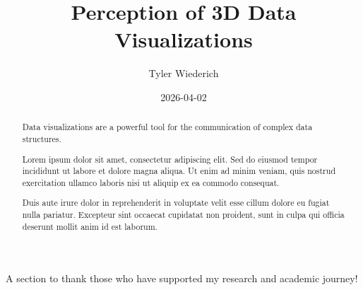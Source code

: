\documentclass[
  letterpaper,
  DIV=11,
  numbers=noendperiod]{scrreprt}
\title{Perception of 3D Data Visualizations}
\author{Tyler Wiederich}
\date{2026-04-02}
\renewcommand*\contentsname{Table of contents}
\newcommand\contentsname{Table of contents}
\begin{document}
\maketitle

\renewcommand*\contentsname{Table of contents}
{
\hypersetup{linkcolor=}
\setcounter{tocdepth}{2}
\tableofcontents
}


\chapter{}\label{section}

\begin{abstract}
\thispagestyle{empty}

Data visualizations are a powerful tool for the communication of complex
data structures.

Lorem ipsum dolor sit amet, consectetur adipiscing elit. Sed do eiusmod
tempor incididunt ut labore et dolore magna aliqua. Ut enim ad minim
veniam, quis nostrud exercitation ullamco laboris nisi ut aliquip ex ea
commodo consequat.

Duis aute irure dolor in reprehenderit in voluptate velit esse cillum
dolore eu fugiat nulla pariatur. Excepteur sint occaecat cupidatat non
proident, sunt in culpa qui officia deserunt mollit anim id est laborum.

\end{abstract}
\begin{acknowledgments}

A section to thank those who have supported my research and academic
journey!

\end{acknowledgments}

\tableofcontents
\listoffigures
\listoftables
\mainmatter
{}
\doublespacing
\end{document}
